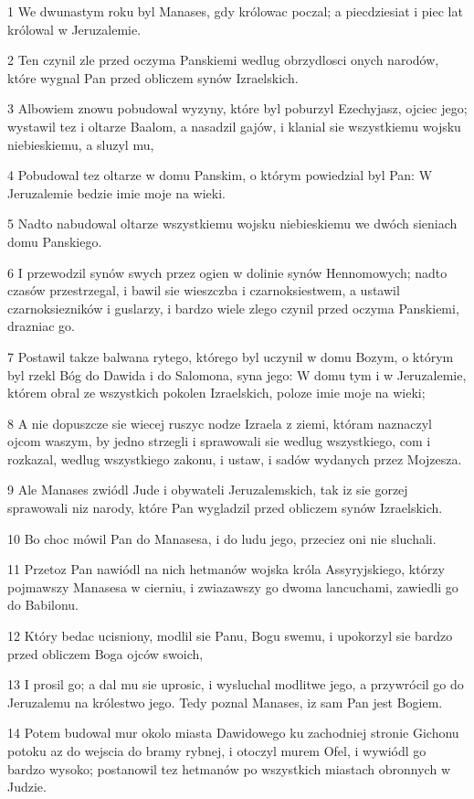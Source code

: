 \par 1 We dwunastym roku byl Manases, gdy królowac poczal; a piecdziesiat i piec lat królowal w Jeruzalemie.
\par 2 Ten czynil zle przed oczyma Panskiemi wedlug obrzydlosci onych narodów, które wygnal Pan przed obliczem synów Izraelskich.
\par 3 Albowiem znowu pobudowal wyzyny, które byl poburzyl Ezechyjasz, ojciec jego; wystawil tez i oltarze Baalom, a nasadzil gajów, i klanial sie wszystkiemu wojsku niebieskiemu, a sluzyl mu,
\par 4 Pobudowal tez oltarze w domu Panskim, o którym powiedzial byl Pan: W Jeruzalemie bedzie imie moje na wieki.
\par 5 Nadto nabudowal oltarze wszystkiemu wojsku niebieskiemu we dwóch sieniach domu Panskiego.
\par 6 I przewodzil synów swych przez ogien w dolinie synów Hennomowych; nadto czasów przestrzegal, i bawil sie wieszczba i czarnoksiestwem, a ustawil czarnoksiezników i guslarzy, i bardzo wiele zlego czynil przed oczyma Panskiemi, drazniac go.
\par 7 Postawil takze balwana rytego, którego byl uczynil w domu Bozym, o którym byl rzekl Bóg do Dawida i do Salomona, syna jego: W domu tym i w Jeruzalemie, którem obral ze wszystkich pokolen Izraelskich, poloze imie moje na wieki;
\par 8 A nie dopuszcze sie wiecej ruszyc nodze Izraela z ziemi, któram naznaczyl ojcom waszym, by jedno strzegli i sprawowali sie wedlug wszystkiego, com i rozkazal, wedlug wszystkiego zakonu, i ustaw, i sadów wydanych przez Mojzesza.
\par 9 Ale Manases zwiódl Jude i obywateli Jeruzalemskich, tak iz sie gorzej sprawowali niz narody, które Pan wygladzil przed obliczem synów Izraelskich.
\par 10 Bo choc mówil Pan do Manasesa, i do ludu jego, przeciez oni nie sluchali.
\par 11 Przetoz Pan nawiódl na nich hetmanów wojska króla Assyryjskiego, którzy pojmawszy Manasesa w cierniu, i zwiazawszy go dwoma lancuchami, zawiedli go do Babilonu.
\par 12 Który bedac ucisniony, modlil sie Panu, Bogu swemu, i upokorzyl sie bardzo przed obliczem Boga ojców swoich,
\par 13 I prosil go; a dal mu sie uprosic, i wysluchal modlitwe jego, a przywrócil go do Jeruzalemu na królestwo jego. Tedy poznal Manases, iz sam Pan jest Bogiem.
\par 14 Potem budowal mur okolo miasta Dawidowego ku zachodniej stronie Gichonu potoku az do wejscia do bramy rybnej, i otoczyl murem Ofel, i wywiódl go bardzo wysoko; postanowil tez hetmanów po wszystkich miastach obronnych w Judzie.
